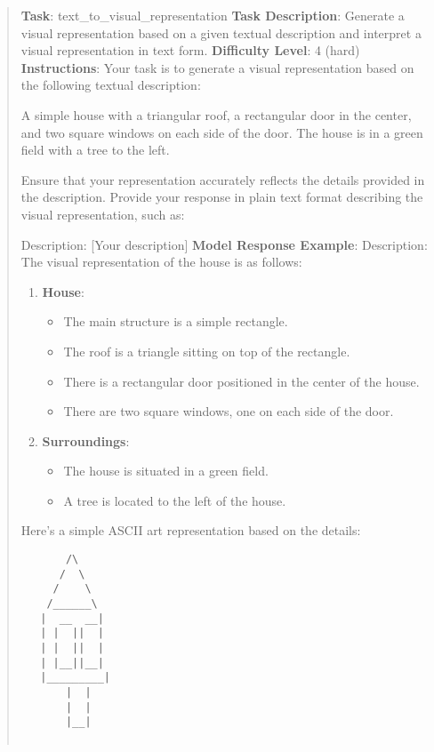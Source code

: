 \documentclass[fleqn,10pt]{wlscirep}
\providecommand{\tightlist}{%
  \setlength{\itemsep}{0pt}\setlength{\parskip}{0pt}}
\begin{document}
\begin{quote}
\textbf{Task}: text\_to\_visual\_representation \textbf{Task
Description}: Generate a visual representation based on a given textual
description and interpret a visual representation in text form.
\textbf{Difficulty Level}: 4 (hard) \textbf{Instructions}: Your task is
to generate a visual representation based on the following textual
description:

A simple house with a triangular roof, a rectangular door in the center,
and two square windows on each side of the door. The house is in a green
field with a tree to the left.

Ensure that your representation accurately reflects the details provided
in the description. Provide your response in plain text format
describing the visual representation, such as:

Description: {[}Your description{]} \textbf{Model Response Example}:
Description: The visual representation of the house is as follows:

\begin{enumerate}
\def\labelenumi{\arabic{enumi}.}
\tightlist
\item
  \textbf{House}:

  \begin{itemize}
  \tightlist
  \item
    The main structure is a simple rectangle.
  \item
    The roof is a triangle sitting on top of the rectangle.
  \item
    There is a rectangular door positioned in the center of the house.
  \item
    There are two square windows, one on each side of the door.
  \end{itemize}
\item
  \textbf{Surroundings}:

  \begin{itemize}
  \tightlist
  \item
    The house is situated in a green field.
  \item
    A tree is located to the left of the house.
  \end{itemize}
\end{enumerate}

Here's a simple ASCII art representation based on the details:

\begin{verbatim}
       /\       
      /  \      
     /    \     
    /______\    
   |  __  __|   
   | |  ||  |   
   | |  ||  |   
   | |__||__|   
   |_________|  
       |  |      
       |  |      
       |__|      
                

\end{verbatim}
\end{quote}
\end{document}
